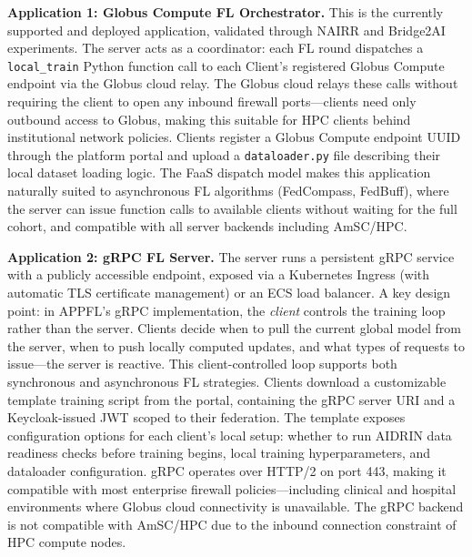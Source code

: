 \documentclass[conference]{IEEEtran}
\begin{document}
\textbf{Application 1: Globus Compute FL Orchestrator.} This is the
currently supported and deployed application, validated through NAIRR
and Bridge2AI experiments. The server acts as a coordinator: each FL
round dispatches a \texttt{local\_train} Python function call to each
Client's registered Globus Compute endpoint via the Globus cloud relay.
The Globus cloud relays these calls without requiring the client to
open any inbound firewall ports---clients need only outbound access to
Globus, making this suitable for HPC clients behind institutional
network policies. Clients register a Globus Compute endpoint UUID
through the platform portal and upload a \texttt{dataloader.py} file
describing their local dataset loading logic. The FaaS dispatch model
makes this application naturally suited to asynchronous FL algorithms
(FedCompass, FedBuff), where the server can issue function calls to
available clients without waiting for the full cohort, and compatible
with all server backends including AmSC/HPC.

\textbf{Application 2: gRPC FL Server.} The server runs a persistent
gRPC service with a publicly accessible endpoint, exposed via a
Kubernetes Ingress (with automatic TLS certificate management) or an
ECS load balancer. A key design point: in APPFL's gRPC implementation,
the \emph{client} controls the training loop rather than the server.
Clients decide when to pull the current global model from the server,
when to push locally computed updates, and what types of requests to
issue---the server is reactive. This client-controlled loop supports
both synchronous and asynchronous FL strategies. Clients download a
customizable template training script from the portal, containing the
gRPC server URI and a Keycloak-issued JWT scoped to their federation.
The template exposes configuration options for each client's local
setup: whether to run AIDRIN data readiness checks before training
begins, local training hyperparameters, and dataloader configuration.
gRPC operates over HTTP/2 on port 443, making it compatible with most
enterprise firewall policies---including clinical and hospital
environments where Globus cloud connectivity is unavailable. The gRPC
backend is not compatible with AmSC/HPC due to the inbound connection
constraint of HPC compute nodes.
\end{document}
